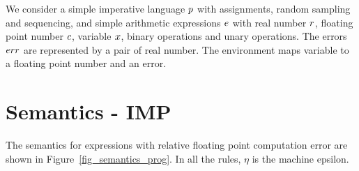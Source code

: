 \documentclass[a4paper,11pt]{article}
\begin{document}

We consider a simple imperative language $p$ with assignments, random sampling and sequencing, and simple arithmetic expressions $e$ with real number $r$, floating point number $c$, variable $x$, binary operations and unary operations.
The errors $err$ are represented by a pair of real number. The environment maps variable to a floating point number and an error.
%
%
%
\section{Semantics - IMP}
%
The semantics for expressions with relative
floating point computation error are shown in
Figure~\ref{fig_semantics_prog}.
In all the rules, $\eta$ is the machine epsilon.
\end{document}

